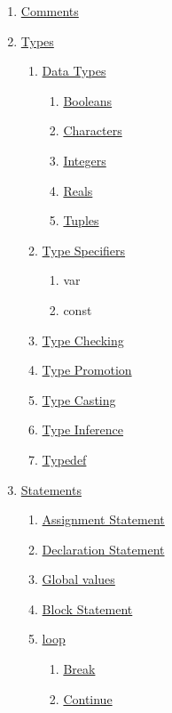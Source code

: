 \documentclass{article}
\begin{document}
	\begin{enumerate}[label*=\arabic*]
		\item \hyperref[sec:comments]{Comments}
		\item \hyperref[sec:types]{Types}
		\begin{enumerate}[label*=.\arabic*]
			\item \hyperref[sec:types]{Data Types}
			\begin{enumerate}[label*=.\arabic*]
				\item \hyperref[sec:boolean]{Booleans}
				\item \hyperref[sec:character]{Characters}
				\item \hyperref[sec:integer]{Integers}
				\item \hyperref[sec:real]{Reals}
				\item \hyperref[sec:tuple]{Tuples}
			\end{enumerate}
			\item \hyperref[sec:typeSpecifiers]{Type Specifiers}
			\begin{enumerate}[label*=.\arabic*]
				\item var
				\item const
			\end{enumerate}
			\item \hyperref[sec:typeChecking]{Type Checking}
			\item \hyperref[sec:typePromotion]{Type Promotion}
			\item \hyperref[sec:typeCasting]{Type Casting}
			\item \hyperref[sec:typeInference]{Type Inference}
			\item \hyperref[sec:typedef]{Typedef}
		\end{enumerate}
		\item \hyperref[sec:statements]{Statements}
		\begin{enumerate}[label*=.\arabic*]
			\item \hyperref[sec:assignment]{Assignment Statement}
			\item \hyperref[sec:declaration]{Declaration Statement}
			\item \hyperref[sec:global]{Global values}
			\item \hyperref[sec:block]{Block Statement}
			\item \hyperref[sec:loop]{loop}
			\begin{enumerate}[label*=.\arabic*]
				\item \hyperref[sec:break]{Break}
				\item \hyperref[sec:continue]{Continue}

\end{enumerate}
\end{enumerate}
\end{enumerate}
\end{document}
